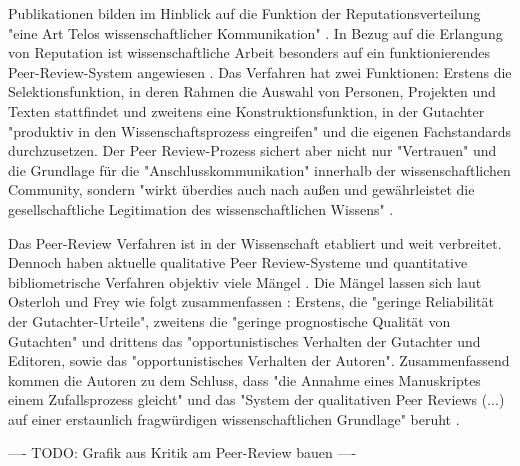 Publikationen bilden im Hinblick auf die Funktion der Reputationsverteilung "eine Art Telos wissenschaftlicher Kommunikation" \cite{hirschauer2004peer}. In Bezug auf die Erlangung von Reputation ist wissenschaftliche Arbeit besonders auf ein funktionierendes Peer-Review-System angewiesen \cite{suchen}. Das Verfahren hat zwei Funktionen: Erstens die Selektionsfunktion, in deren Rahmen die Auswahl von Personen, Projekten und Texten stattfindet und zweitens eine Konstruktionsfunktion, in der Gutachter "produktiv in den Wissenschaftsprozess eingreifen" \cite{Neidhardt_2010} und die eigenen Fachstandards durchzusetzen. Der Peer Review-Prozess sichert aber nicht nur "Vertrauen" und die Grundlage für die "Anschlusskommunikation" innerhalb der wissenschaftlichen Community, sondern "wirkt überdies auch nach außen und gewährleistet die gesellschaftliche Legitimation des wissenschaftlichen Wissens" \cite{pscheida_2010_wikipedia}.

Das Peer-Review Verfahren ist in der Wissenschaft etabliert und weit verbreitet. Dennoch haben aktuelle qualitative Peer Review-Systeme und quantitative bibliometrische Verfahren objektiv viele Mängel \cite{osterloh2008anreize} \cite{Lee_2012} \cite{Jansen_2007}. Die Mängel lassen sich laut Osterloh und Frey wie folgt zusammenfassen \cite{osterloh2008anreize}: Erstens, die "geringe Reliabilität der Gutachter-Urteile", zweitens die "geringe prognostische Qualität von Gutachten" und drittens das "opportunistisches Verhalten der Gutachter und Editoren, sowie das "opportunistisches Verhalten der Autoren". Zusammenfassend kommen die Autoren zu dem Schluss, dass "die Annahme eines Manuskriptes einem Zufallsprozess gleicht" und das "System der qualitativen Peer Reviews (...) auf einer erstaunlich fragwürdigen wissenschaftlichen Grundlage" beruht \cite{osterloh2008anreize}.

---- TODO: Grafik aus Kritik am Peer-Review bauen \cite{mueller_2009_peerreview} ----

